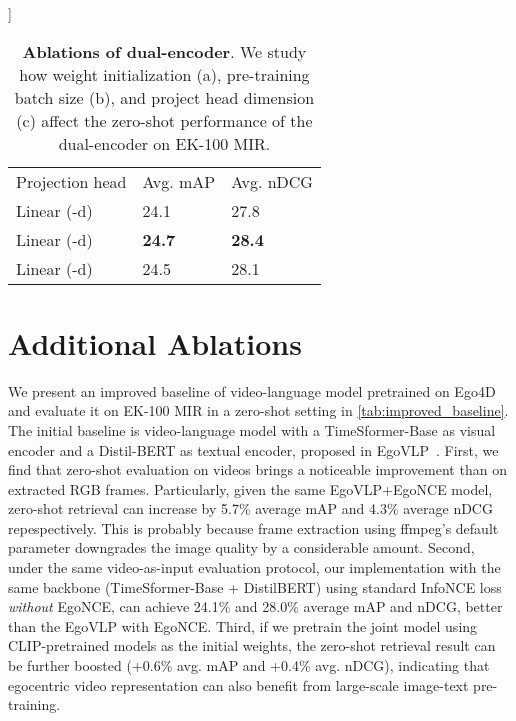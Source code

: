 \documentclass[10pt,twocolumn,letterpaper]{article}
\newcommand{\tablestyle}[2]{\setlength{\tabcolsep}{#1}\renewcommand{\arraystretch}{#2}\centering\footnotesize}
\newcommand{\thickhline}{\Xhline{3\arrayrulewidth}}
\newcommand{\myparagraph}[1]{\vspace{0pt}\noindent{\bf #1}}
\newcommand{\ekmir}{EK-100 MIR\xspace}
\begin{document}
\begin{table*}[t]
	\label{tab:projection_head}
	]{
		\begin{minipage}{0.25\linewidth}{\begin{center}
					\tablestyle{1pt}{1.05}
					\begin{tabular}{x{48}|x{24}x{24}}
						Projection head & Avg. mAP & Avg. nDCG  \\
						\thickhline
						Linear (-d) & 24.1 & 27.8  \\
						 Linear (-d) & {\bf 24.7} & {\bf 28.4} \\
						Linear (-d) &  24.5 & 28.1 \\
						\hline
					\end{tabular}
		\end{center}}\end{minipage}
	}
	\caption{\textbf{Ablations of dual-encoder}. We study how weight initialization (a), pre-training batch size (b), and project head dimension (c) affect the zero-shot performance of the dual-encoder on \ekmir.}
	\label{tab:ablations_vlp}
\end{table*}


\section{Additional Ablations}\label{sec:appdx:ablations}

\myparagraph{Improved Baseline on EK-100 MIR.}
We present an improved baseline of video-language model pretrained on Ego4D and evaluate it on EK-100 MIR in a zero-shot setting in \cref{tab:improved_baseline}.
The initial baseline is video-language model with a TimeSformer-Base as visual encoder and a Distil-BERT as textual encoder, proposed in EgoVLP~\cite{lin2022egovlp}.
First, we find that zero-shot evaluation on videos brings a noticeable improvement than on extracted RGB frames.
Particularly, given the same EgoVLP+EgoNCE model, zero-shot retrieval can increase by 5.7\% average mAP and 4.3\% average nDCG repespectively.
This is probably because frame extraction using ffmpeg's default parameter downgrades the image quality by a considerable amount.
Second, under the same video-as-input evaluation protocol, our implementation with the same backbone (TimeSformer-Base + DistilBERT) using standard InfoNCE loss \emph{without} EgoNCE, can achieve 24.1\% and 28.0\% average mAP and nDCG, better than the EgoVLP with EgoNCE.
Third, if we pretrain the joint model using CLIP-pretrained models as the initial weights, the zero-shot retrieval result can be further boosted (+0.6\% avg. mAP and +0.4\% avg. nDCG), indicating that egocentric video representation can also benefit from large-scale image-text pre-training.
\end{document}
